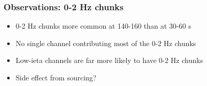 \documentclass[bigger]{beamer}
\begin{document}
\begin{frame}
\frametitle{Observations: 0-2 Hz chunks}
\label{sec-3-2-4}
\begin{itemize}

\item 0-2 Hz chunks more common at 140-160 than at 30-60 s
\label{sec-3-2-4-1}%

\item No single channel contributing most of the 0-2 Hz chunks
\label{sec-3-2-4-2}%

\item Low-ieta channels are far more likely to have 0-2 Hz chunks
\label{sec-3-2-4-3}%

\item Side effect from sourcing?
\label{sec-3-2-4-4}%
\end{itemize} %
\end{frame}
\end{document}
